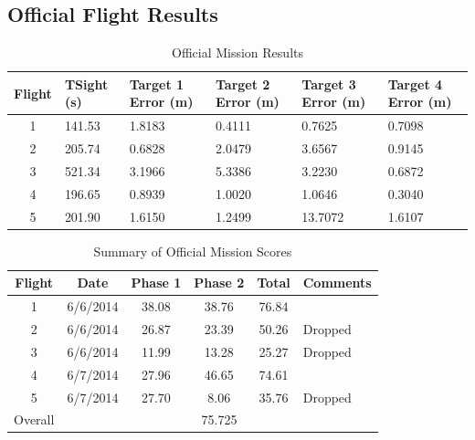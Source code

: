 \documentclass[11pt]{article}
\begin{document}
	\subsection{Official Flight Results}
	\label{OffFltRes}
\begin{table}[!ht]
\caption{Official Mission Results}
\label{tab:ResultsSummary}
\begin{center}
    \begin{tabular}{ | c | p{2cm} | p{2cm} | p{2cm} | p{2cm} | p{2cm} |}
    \hline
    \textbf{Flight} & \textbf{TSight (s)} & \textbf{Target 1 \newline Error (m)} & \textbf{Target 2 \newline Error (m)} & \textbf{Target 3 \newline Error (m)} & \textbf{Target 4 \newline Error (m)} \\ \hline
    1 & 141.53 & 1.8183 & 0.4111 & 0.7625 & 0.7098\\ \hline
    2 & 205.74 & 0.6828 & 2.0479 & 3.6567 & 0.9145\\ \hline
    3 & 521.34 & 3.1966 & 5.3386 & 3.2230 & 0.6872\\ \hline
    4 & 196.65 & 0.8939 & 1.0020 & 1.0646 & 0.3040\\ \hline
    5 & 201.90 & 1.6150 & 1.2499 & 13.7072 & 1.6107\\ \hline
    \end{tabular}
\end{center}
\end{table}

\begin{table}[!ht]
\caption{Summary of Official Mission Scores}
\label{tab:ScoreSummary}
\begin{center}
    \begin{tabular}{ | c | c | c | c | c | p{3cm} |}
    \hline
    \textbf{Flight} & \textbf{Date} & \textbf{Phase 1} & \textbf{Phase 2} & \textbf{Total} & \textbf{Comments} \\ \hline
    1 & 6/6/2014 & 38.08 & 38.76 & 76.84 & \\ \hline
    2 & 6/6/2014 & 26.87 & 23.39 & 50.26 & Dropped\\ \hline
    3 & 6/6/2014 & 11.99 & 13.28 & 25.27 & Dropped\\ \hline
    4 & 6/7/2014 & 27.96 & 46.65 & 74.61 & \\ \hline
    5 & 6/7/2014 & 27.70 & 8.06 & 35.76 & Dropped\\ \hline
    Overall & \multicolumn{5}{c|}{75.725}\\ \hline   
    \end{tabular}
\end{center}
\end{table}
\end{document}
